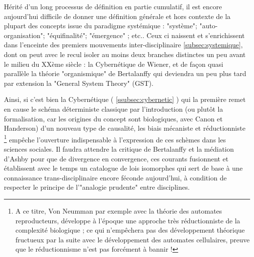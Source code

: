 Hérité d'un long processus de définition en partie cumulatif, il est encore aujourd'hui difficile de donner une définition générale et hors contexte de la plupart des concepts issue du paradigme systémique : "système"; "auto-organisation"; "équifinalité"; "émergence" ; etc.. Ceux ci naissent et s'enrichissent dans l'enceinte des premiers mouvements inter-disciplinaire \ref{subsec:systemique}, dont on peut avec le recul isoler au moins deux branches distinctes  un peu avant le milieu du XXème siècle : la Cybernétique de Wiener, et de façon quasi parallèle la théorie "organismique" de Bertalanffy qui deviendra un peu plus tard par extension la "General System Theory" (GST).

Ainsi, si c'est bien la Cybernétique ( \ref{ssubsec:cybernetic} ) qui la première remet en cause le schéma déterministe classique par l'introduction (ou plutôt la formalisation, car les origines du concept sont biologiques, avec Canon et Handerson) d'un nouveau type de causalité, les biais mécaniste et réductionniste \footnote{A ce titre, Von Neumman par exemple avec la théorie des automates reproducteurs, développe à l'époque une approche très réductionniste de la complexité biologique \autocite[783]{Pouvreau2013}; ce qui n’empêchera pas des développement théorique fructueux par la suite avec le développement des automates cellulaires, preuve que le réductionnisme n'est pas forcément à bannir !} empêche l'ouverture indispensable à l'expression de ces schèmes dans les sciences sociales.\autocite[783-784]{Pouvreau2013} Il faudra attendre la critique de Bertalanffy et la médiation d'Ashby pour que de divergence en convergence, ces courants fusionnent et établissent avec le temps un catalogue de lois isomorphes qui sert de base à une connaissance trans-disciplinaire encore féconde aujourd'hui, à condition de respecter le principe de l'"analogie prudente" entre disciplines. 

